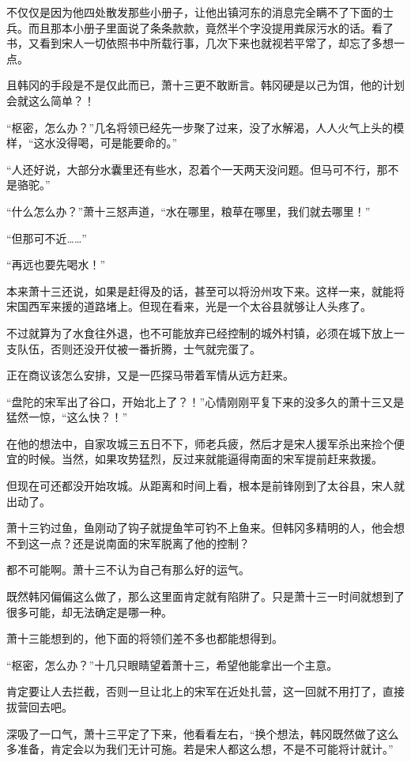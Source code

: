 不仅仅是因为他四处散发那些小册子，让他出镇河东的消息完全瞒不了下面的士兵。而且那本小册子里面说了条条款款，竟然半个字没提用粪尿污水的话。看了书，又看到宋人一切依照书中所载行事，几次下来也就视若平常了，却忘了多想一点。

且韩冈的手段是不是仅此而已，萧十三更不敢断言。韩冈硬是以己为饵，他的计划会就这么简单？！

“枢密，怎么办？”几名将领已经先一步聚了过来，没了水解渴，人人火气上头的模样，“这水没得喝，可是能要命的。”

“人还好说，大部分水囊里还有些水，忍着个一天两天没问题。但马可不行，那不是骆驼。”

“什么怎么办？”萧十三怒声道，“水在哪里，粮草在哪里，我们就去哪里！”

“但那可不近……”

“再远也要先喝水！”

本来萧十三还说，如果是赶得及的话，甚至可以将汾州攻下来。这样一来，就能将宋国西军来援的道路堵上。但现在看来，光是一个太谷县就够让人头疼了。

不过就算为了水食往外退，也不可能放弃已经控制的城外村镇，必须在城下放上一支队伍，否则还没开仗被一番折腾，士气就完蛋了。

正在商议该怎么安排，又是一匹探马带着军情从远方赶来。

“盘陀的宋军出了谷口，开始北上了？！”心情刚刚平复下来的没多久的萧十三又是猛然一惊，“这么快？！”

在他的想法中，自家攻城三五日不下，师老兵疲，然后才是宋人援军杀出来捡个便宜的时候。当然，如果攻势猛烈，反过来就能逼得南面的宋军提前赶来救援。

但现在可还都没开始攻城。从距离和时间上看，根本是前锋刚到了太谷县，宋人就出动了。

萧十三钓过鱼，鱼刚动了钩子就提鱼竿可钓不上鱼来。但韩冈多精明的人，他会想不到这一点？还是说南面的宋军脱离了他的控制？

都不可能啊。萧十三不认为自己有那么好的运气。

既然韩冈偏偏这么做了，那么这里面肯定就有陷阱了。只是萧十三一时间就想到了很多可能，却无法确定是哪一种。

萧十三能想到的，他下面的将领们差不多也都能想得到。

“枢密，怎么办？”十几只眼睛望着萧十三，希望他能拿出一个主意。

肯定要让人去拦截，否则一旦让北上的宋军在近处扎营，这一回就不用打了，直接拔营回去吧。

深吸了一口气，萧十三平定了下来，他看看左右，“换个想法，韩冈既然做了这么多准备，肯定会以为我们无计可施。若是宋人都这么想，不是不可能将计就计。”

